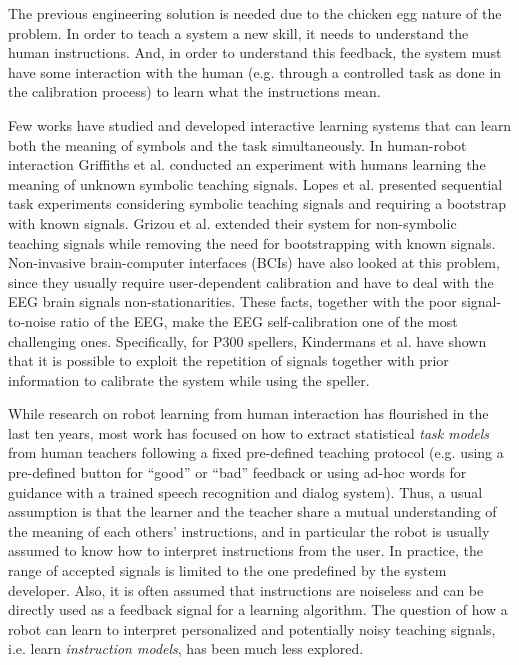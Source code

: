 The previous engineering solution is needed due to the chicken egg nature of the problem. In order to teach a system a new skill, it needs to understand the human instructions. And, in order to understand this feedback, the system must have some interaction with the human (e.g. through a controlled task as done in the calibration process) to learn what the instructions mean. 

Few works have studied and developed interactive learning systems that can learn both the meaning of symbols and the task simultaneously. In human-robot interaction Griffiths et al. \cite{griffiths2012bottom} conducted an experiment with humans learning the meaning of unknown symbolic teaching signals. Lopes et al. \cite{macl11simul} presented sequential task experiments considering symbolic teaching signals and requiring a bootstrap with known signals. Grizou et al. \cite{grizou2013robot} extended their system for non-symbolic teaching signals while removing the need for bootstrapping with known signals. Non-invasive brain-computer interfaces (BCIs) have also looked at this problem, since they usually require user-dependent calibration and have to deal with the EEG brain signals non-stationarities. These facts, together with the poor signal-to-noise ratio of the EEG, make the EEG self-calibration one of the most challenging ones. Specifically, for P300 spellers, Kindermans et al. have shown that it is possible to exploit the repetition of signals together with prior information  \cite{Kindermans2012a,Kindermans2012b} to calibrate the system while using the speller.


While research on robot learning from human interaction has flourished in the last ten years, most work has focused on how to extract statistical \textit{task models} from human teachers following a fixed pre-defined teaching protocol (e.g. using a pre-defined button for ``good'' or ``bad'' feedback or using ad-hoc words for guidance with a trained speech recognition and dialog system). Thus, a usual assumption is that the learner and the teacher share a mutual understanding of the meaning of each others' instructions, and in particular the robot is usually assumed to know how to interpret instructions from the user. In practice, the range of accepted signals is limited to the one predefined by the system developer. Also, it is often assumed that instructions are noiseless and can be directly used as a feedback signal for a learning algorithm. The question of how a robot can learn to interpret personalized and potentially noisy teaching signals, i.e. learn \textit{instruction models}, has been much less explored.

